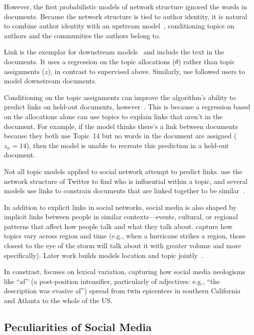 However, the first probabilistic models of network structure ignored
the words in documents.  Because the network structure is tied to
author identity, it is natural to combine author identity with
an upstream model~\citet{mccallum-07,liu-09}, conditioning topics on
authors and the communities the authors belong to.

Link  is the exemplar for downstream
models~\citep{nallapati-08} and include the text in the documents.  It
uses a regression on the topic allocations ($\theta$) rather than
topic assignments ($z$), in contrast to supervised  above.  Similarly, \citet{cha-12} use
followed users to model downstream documents.

Conditioning on the topic assignments can improve the algorithm's
ability to predict links on held-out documents,
however~\citep{chang-09a}.  This is because a regression based on the
allocations alone can use topics to explain links that aren't in the
document.  For example, if the model thinks there's a link between
documents because they both use Topic~14 but no words in the document
are assigned ($z_n=14$), then the model is unable to recreate this
prediction in a held-out document.  

Not all topic models applied to social network attempt to predict
links.  \citet{weng-10} use the network structure of Twitter to find
who is influential within a topic, and several models use links to
constrain documents that are linked together to be
similar~\citep{mei-08,sun-09,daume-09}.

In addition to explicit links in social networks, social media is also
shaped by implicit links between people in similar contexts---events,
cultural, or regional patterns that affect how people talk and what
they talk about.  \citet{mei-06} capture how topics vary across region
and time (e.g., when a hurricane strikes a region, those closest to
the eye of the storm will talk about it with greater volume and more
specifically).  Later work builds models location and topic
jointly~\citep{yin-11}.

In constrast, \citet{eisenstein-17} focuses on lexical variation,
capturing how social media neologisms like ``af'' (a post-position
intensifier, particularly of adjectives: e.g., ``the description was
evasive af'') spread from twin epicenters in southern California and
Atlanta to the whole of the US.

\subsection{Peculiarities of Social Media}
\label{sec:twitter-strange}

